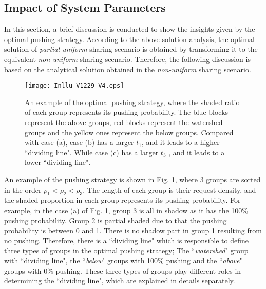 \documentclass[12pt, draftclsnofoot, onecolumn]{IEEEtran}
\begin{document}
\subsection {Impact of System Parameters}
In this section, a brief discussion is conducted to show the insights given by the optimal pushing strategy.
According to the above solution analysis, the optimal solution of \textit{partial-uniform} sharing scenario is obtained by transforming it to the equivalent \textit{non-uniform} sharing scenario.
Therefore, the following discussion is based on the analytical solution obtained in the \textit{non-uniform} sharing scenario.

\begin{figure}
\centering
\texttt{[image: Inllu\_V1229\_V4.eps]}
\caption{An example of the optimal pushing strategy, where the shaded ratio of each group represents its pushing probability.
The blue blocks represent the above groups, red blocks represent the watershed groups and the yellow ones represent the below groups.
Compared with case (a), case (b) has a larger $t_1$, and it leads to a higher ``dividing line".
While case (c) has a larger $t_3$ , and it leads to a lower ``dividing line". }
\label{figlull}
\end{figure}

An example of the pushing strategy is shown in Fig. \ref{figlull}, where 3 groups are sorted in the order $\rho_1 < \rho_2 <\rho_3$.
The length of each group is their request density, and the shaded proportion in each group represents its pushing probability.
For example, in the case (a) of Fig. \ref{figlull}, group 3 is all in shadow as it has the 100\% pushing probability.
Group 2 is partial shaded due to that the pushing probability is between 0 and 1.
There is no shadow part in group 1 resulting from no pushing.
Therefore, there is a ``dividing line" which is responsible to define three types of groups in the optimal pushing strategy;
The ``\textit{watershed}" group with ``dividing line", the ``\textit{below}" groups with 100\% pushing and the ``\textit{above}" groups with 0\% pushing.
These three types of groups play different roles in determining the ``dividing line", which are explained in details separately.
\end{document}
